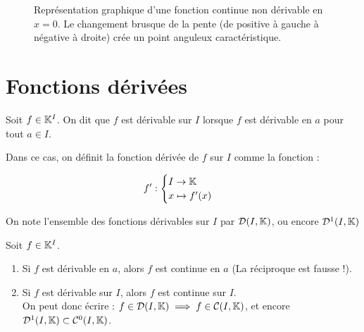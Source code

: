 \documentclass[12pt, a4paper]{report}
\begin{document}
\begin{figure}[H]
    \caption{Représentation graphique d'une fonction continue non dérivable en $x=0$. Le changement brusque de la pente (de positive à gauche à négative à droite) crée un point anguleux caractéristique.}
    \label{fig:point_anguleux}
\end{figure}

\section{Fonctions dérivées}

\begin{definition}
    Soit $f\in \mathbb{K}^I$. On dit que $f$ est dérivable sur $I$ lorsque $f$ est dérivable en $a$ pour tout $a \in I$.

    Dans ce cas, on définit la fonction dérivée de $f$ sur $I$ comme la fonction :

    $$f' : \begin{cases}I\to\mathbb{K}\\x\mapsto f'(x)\end{cases}$$

    On note l'ensemble des fonctions dérivables sur $I$ par $\mathcal{D}(I,\mathbb{K})$, ou encore $\mathcal{D}^1(I,\mathbb{K})$
\end{definition}

\begin{property}
    Soit $f \in \mathbb{K}^I$.
    \begin{enumerate}
        \item Si $f$ est dérivable en $a$, alors $f$ est continue en $a$ (La réciproque est fausse !).
        \item Si $f$ est dérivable sur $I$, alors $f$ est continue sur $I$.\\On peut donc écrire : $f \in \mathcal{D}(I,\mathbb{K}) \implies f \in \mathcal{C}(I,\mathbb{K})$, et encore $\mathcal{D}^1(I,\mathbb{K}) \subset \mathcal{C}^0(I,\mathbb{K})$.
    \end{enumerate}
\end{property}
\end{document}
